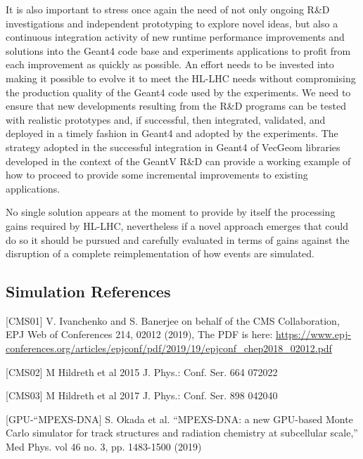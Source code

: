 \documentclass[11pt,a4paper]{article}
\begin{document}
It is also important to stress once again the need of not only ongoing
R\&D investigations and independent prototyping to explore novel ideas,
but also a continuous integration activity of new runtime performance
improvements and solutions into the Geant4 code base and experiments
applications to profit from each improvement as quickly as possible. An
effort needs to be invested into making it possible to evolve it to meet
the HL-LHC needs without compromising the production quality of the
Geant4 code used by the experiments. We need to ensure that new
developments resulting from the R\&D programs can be tested with
realistic prototypes and, if successful, then integrated, validated, and
deployed in a timely fashion in Geant4 and adopted by the experiments.
The strategy adopted in the successful integration in Geant4 of VecGeom
libraries developed in the context of the GeantV R\&D can provide a
working example of how to proceed to provide some incremental
improvements to existing applications.

No single solution appears at the moment to provide by itself the
processing gains required by HL-LHC, nevertheless if a novel approach
emerges that could do so it should be pursued and carefully evaluated in
terms of gains against the disruption of a complete reimplementation of
how events are simulated.

\subsection{Simulation References}\label{references-1}


{[}CMS01{]} V. Ivanchenko and S. Banerjee on behalf of the CMS
Collaboration, EPJ Web of Conferences 214, 02012 (2019), The PDF is
here:
\url{https://www.epj-conferences.org/articles/epjconf/pdf/2019/19/epjconf_chep2018_02012.pdf}

{[}CMS02{]} M Hildreth et al 2015 J. Phys.: Conf. Ser. 664 072022

{[}CMS03{]} M Hildreth et al 2017 J. Phys.: Conf. Ser. 898 042040

{[}GPU-``MPEXS-DNA{]} S. Okada et al. ``MPEXS-DNA: a new GPU-based Monte
Carlo simulator for track structures and radiation chemistry at
subcellular scale,'' Med Phys. vol 46 no. 3, pp. 1483-1500 (2019)
\end{document}

